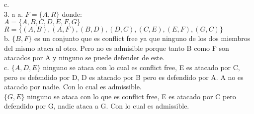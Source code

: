 c.  \\

3. a
a. $F=\{A, R\}$ donde: \\
$A=\{A, B, C, D, E, F, G\}$ \\
$R=\{(A, B), (A, F), (B, D), (D, C), (C, E), (E, F), (G, C)\}$ \\

b. $\{B, F\}$ es un conjunto que es conflict free ya que ninguno de los dos miembros del mismo ataca al otro. Pero no es admisible porque tanto B como F son atacados por A y ninguno se puede defender de este.\\

c. $\{A, D, E\}$ ninguno se ataca con lo cual es conflict free, E es atacado por C, pero es defendido por D, D es atacado por B pero es defendido por A. A no es atacado por nadie. Con lo cual es admissible. \\

$\{G, E\}$ ninguno se ataca con lo que es conflict free, E es atacado por C pero defendido por G, nadie ataca a G. Con lo cual es admissible.

\bigskip